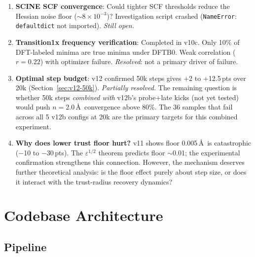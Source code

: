\documentclass[11pt,a4paper]{article}
\theoremstyle{definition}
\begin{document}
\begin{enumerate}
  \item \textbf{SCINE SCF convergence}: Could tighter SCF thresholds reduce
    the Hessian noise floor ($\sim8\times10^{-3}$)?  Investigation script
    crashed (\texttt{NameError}: \texttt{defaultdict} not imported).
    \emph{Still open.}

  \item \textbf{Transition1x frequency verification}: Completed in v10c.
    Only 10\% of DFT-labeled minima are true minima under DFTB0.
    Weak correlation ($r=0.22$) with optimizer failure.
    \emph{Resolved}: not a primary driver of failure.

  \item \textbf{Optimal step budget}: v12 confirmed 50k steps gives
    $+$2 to $+$12.5\,pts over 20k (Section~\ref{sec:v12-50k}).
    \emph{Partially resolved.}  The remaining question is whether
    50k steps \emph{combined with} v12b's probe+late kicks (not yet
    tested) would push $n=2.0$\,\AA\ convergence above 80\%.
    The 36 samples that fail across all 5 v12b configs at 20k are
    the primary targets for this combined experiment.

  \item \textbf{Why does lower trust floor hurt?}  v11 shows floor
    0.005\,\AA\ is catastrophic ($-$10 to $-$30\,pts).  The
    $\varepsilon^{1/2}$ theorem predicts floor $\sim$0.01; the
    experimental confirmation strengthens this connection.  However, the
    mechanism deserves further theoretical analysis: is the floor effect
    purely about step size, or does it interact with the trust-radius
    recovery dynamics?
\end{enumerate}

\section{Codebase Architecture}
\label{sec:architecture}

\subsection{Pipeline}
\end{document}
